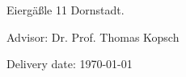

\vspace*{-6mm}

\begin{large} 
\begin{center}
Eiergäßle 11  Dornstadt.
\end{center}
\end{large} 

\vspace*{5mm}

\begin{large} 
\begin{center}
Advisor: Dr. Prof. Thomas Kopsch
\end{center}
\end{large} 


\vspace*{-6mm}

\begin{large} 
\begin{center}
Delivery date: \germandate\today
\end{center}
\end{large} 


\pagestyle{empty} %

